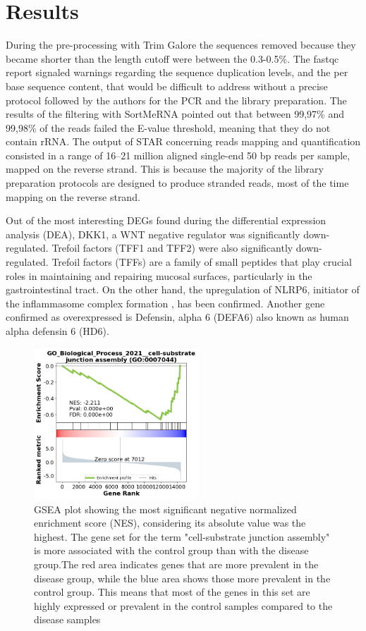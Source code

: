 \documentclass[12pt]{article}
\begin{document}
 
\section{Results}
\noindent During the pre-processing with Trim Galore the sequences removed because they became shorter than the length cutoff were between the 0.3-0.5\%. The fastqc report signaled warnings regarding the sequence duplication levels, and the per base sequence content, that would be difficult to address without a precise protocol followed by the authors for the PCR and the library preparation.
The results of the filtering with SortMeRNA pointed out that between 99,97\% and 99,98\% of the reads failed the E-value threshold, meaning that they do not contain rRNA.
The output of STAR concerning reads mapping and quantification consisted in a range of 16–21 million aligned single-end 50 bp reads per sample, mapped on the reverse strand. This is because the majority of the library preparation protocols are designed to produce stranded reads, most of the time mapping on the reverse strand.

\noindent Out of the most interesting DEGs found during the differential expression analysis (DEA), DKK1, a WNT negative regulator \supercite{fedi1999isolation} was significantly down-regulated. Trefoil factors (TFF1 and TFF2) were also significantly down-regulated. Trefoil factors (TFFs) are a family of small peptides that play crucial roles in maintaining and repairing mucosal surfaces, particularly in the gastrointestinal tract. On the other hand, the upregulation of NLRP6, initiator of the inflammasome
complex formation \supercite{levy2017nlrp6}, has been confirmed. Another gene confirmed as overexpressed is Defensin, alpha 6 (DEFA6) also known as human alpha defensin 6 (HD6). 
\begin{figure}[htb] %
    \centering
    \includegraphics[width=0.55\textwidth]{gseaplot_2.png}
    \caption{GSEA plot showing the most significant negative normalized enrichment score (NES), considering its absolute value was the highest. The gene set for the term "cell-substrate junction assembly" is more associated with the control group than with the disease group.The red area indicates genes that are more prevalent in the disease group, while the blue area shows those more prevalent in the control group. This means that most of the genes in this set are highly expressed or prevalent in the control samples compared to the disease samples }
\end{figure}
 
\end{document}
